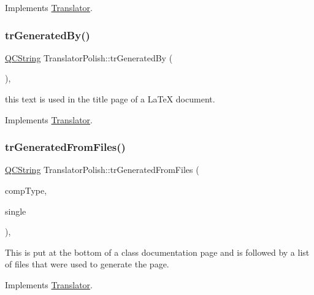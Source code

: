 Implements \mbox{\hyperlink{class_translator}{Translator}}.

\mbox{\label{class_translator_polish_aeb244cad8c4c8b6bd1e991a4a5507852}} 
\subsubsection{\texorpdfstring{trGeneratedBy()}{trGeneratedBy()}}
{\footnotesize\ttfamily \mbox{\hyperlink{class_q_c_string}{Q\+C\+String}} Translator\+Polish\+::tr\+Generated\+By (\begin{DoxyParamCaption}{ }\end{DoxyParamCaption})\hspace{0.3cm}{\ttfamily [inline]}, {\ttfamily [virtual]}}

this text is used in the title page of a La\+TeX document. 

Implements \mbox{\hyperlink{class_translator}{Translator}}.

\mbox{\label{class_translator_polish_abe9db80c7167df1755c7e58f6f2dcfb6}} 
\subsubsection{\texorpdfstring{trGeneratedFromFiles()}{trGeneratedFromFiles()}}
{\footnotesize\ttfamily \mbox{\hyperlink{class_q_c_string}{Q\+C\+String}} Translator\+Polish\+::tr\+Generated\+From\+Files (\begin{DoxyParamCaption}\item[{\mbox{\hyperlink{class_class_def_ae70cf86d35fe954a94c566fbcfc87939}{Class\+Def\+::\+Compound\+Type}}}]{comp\+Type,  }\item[{bool}]{single }\end{DoxyParamCaption})\hspace{0.3cm}{\ttfamily [inline]}, {\ttfamily [virtual]}}

This is put at the bottom of a class documentation page and is followed by a list of files that were used to generate the page. 

Implements \mbox{\hyperlink{class_translator}{Translator}}.

